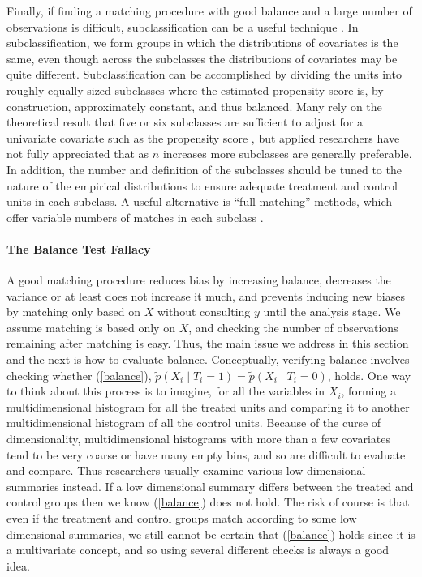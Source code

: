 \documentclass[11pt,titlepage]{article}
\begin{document}
Finally, if finding a matching procedure with good balance and a large
number of observations is difficult, subclassification can be a useful
technique \citep{ImaDyk04}.  In subclassification, we form groups in
which the distributions of covariates is the same, even though across
the subclasses the distributions of covariates may be quite different.
Subclassification can be accomplished by dividing the units into
roughly equally sized subclasses where the estimated propensity score
is, by construction, approximately constant, and thus balanced.  Many
rely on the theoretical result that five or six subclasses are
sufficient to adjust for a univariate covariate such as the propensity
score \citep{Cochran68,RosRub84}, but applied researchers have not
fully appreciated that as $n$ increases more subclasses are generally
preferable.  In addition, the number and definition of the subclasses
should be tuned to the nature of the empirical distributions to ensure
adequate treatment and control units in each subclass.  A useful
alternative is ``full matching'' methods, which offer variable numbers
of matches in each subclass \citep{Hansen04}.

\paragraph{The Balance Test Fallacy}

A good matching procedure reduces bias by increasing balance,
decreases the variance or at least does not increase it much, and
prevents inducing new biases by matching only based on $X$ without
consulting $y$ until the analysis stage.  We assume matching is based
only on $X$, and checking the number of observations remaining after
matching is easy.  Thus, the main issue we address in this section and
the next is how to evaluate balance.  Conceptually, verifying balance
involves checking whether (\ref{balance}), $\tilde p(X_i \mid
T_i=1)=\tilde p(X_i\mid T_i=0)$, holds.  One way to think about this
process is to imagine, for all the variables in $X_i$, forming a
multidimensional histogram for all the treated units and comparing it
to another multidimensional histogram of all the control units.
Because of the curse of dimensionality, multidimensional histograms
with more than a few covariates tend to be very coarse or have many
empty bins, and so are difficult to evaluate and compare.  Thus
researchers usually examine various low dimensional summaries instead.
If a low dimensional summary differs between the treated and control
groups then we know (\ref{balance}) does not hold.  The risk of course
is that even if the treatment and control groups match according to
some low dimensional summaries, we still cannot be certain that
(\ref{balance}) holds since it is a multivariate concept, and so using
several different checks is always a good idea.
\end{document}
